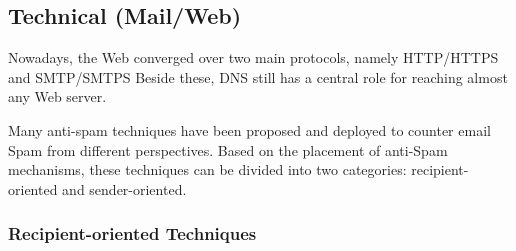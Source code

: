 \subsection{Technical (Mail/Web)}






Nowadays, the Web converged over two main protocols,
	namely HTTP/HTTPS and SMTP/SMTPS
Beside these,
	DNS still has a central role for reaching almost any Web server.


Many anti-spam techniques have been proposed and deployed to counter email Spam from different perspectives.
Based on the placement of anti-Spam mechanisms,
	these techniques can be divided into two categories: recipient-oriented and sender-oriented.

\subsubsection{Recipient-oriented Techniques}

